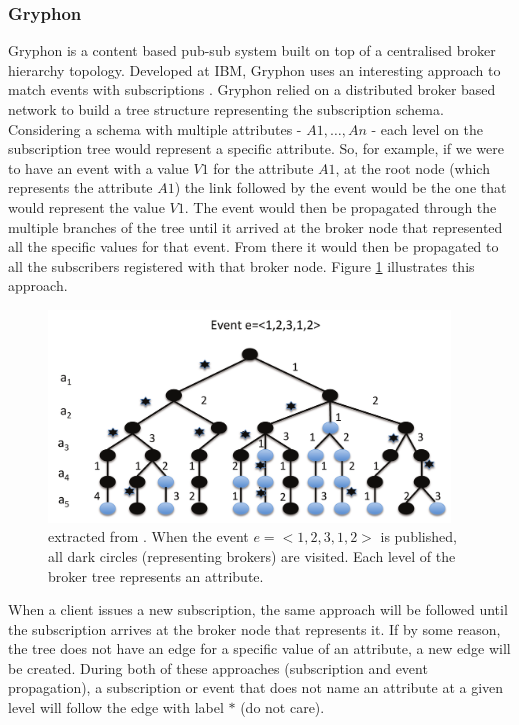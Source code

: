 \subsubsection{Gryphon}\label{gryphon}

Gryphon \cite{Strom1998} is a content based pub-sub system
built on top of a centralised broker hierarchy topology. Developed at
IBM, Gryphon uses an interesting approach to match events with
subscriptions \cite{Aguilera1999}. Gryphon relied on a distributed broker based
network to build a tree structure representing the
subscription schema. Considering a schema with multiple attributes -
$A1,\ldots{},An$ - each level on the subscription tree would represent a
specific attribute. So, for example, if we were to have an event with a
value $V1$ for the attribute $A1$, at the root node (which represents the
attribute $A1$) the link followed by the event would be the one that would
represent the value $V1$. The event would then be propagated through the
multiple branches of the tree until it arrived at the broker node that
represented all the specific values for that event. From there it would
then be propagated to all the subscribers registered with that broker
node. Figure \ref{fig:gryphon} illustrates this approach.

\begin{figure}[hb!]
  \centering
  \includegraphics[width=0.95\textwidth]{img/gryphon.png}
  \caption{extracted from \cite{Kermarrec2013}. When the event $e = <1, 2, 3, 1, 2>$ is published,
  all dark circles (representing brokers) are visited.
  Each level of the broker tree represents an attribute.}
  \label{fig:gryphon}
\end{figure}

When a client issues a new subscription, the same approach will be
followed until the subscription arrives at the broker node that
represents it. If by some reason, the tree does not have an edge for a
specific value of an attribute, a new edge will be created. During both
of these approaches (subscription and event propagation), a subscription
or event that does not name an attribute at a given level will follow
the edge with label $*$ (do not care).

